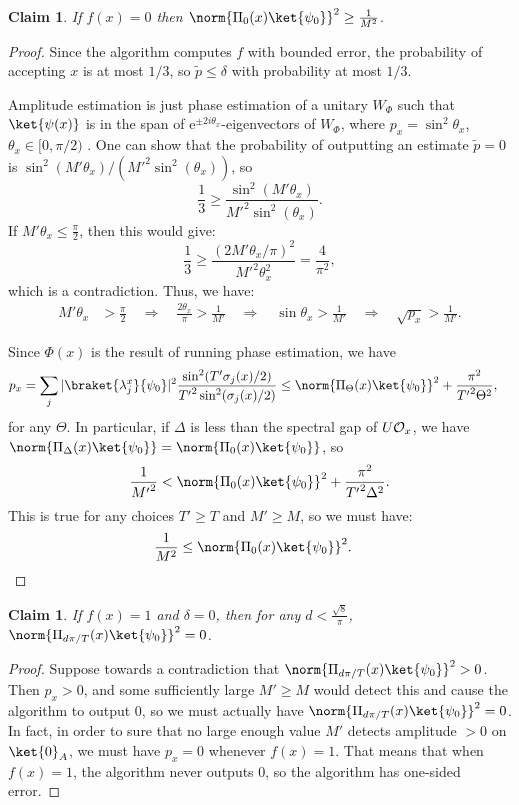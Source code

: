 \documentclass[11pt]{article}
\numberwithin{equation}{section}
\newtheorem{claim}[theorem]{Claim}
\theoremstyle{definition}
\theoremstyle{plain}
\newcommand{\eee}{\mathrm e}
\begin{document}
\begin{claim}
If $f(x)=0$ then $\norm{\Pi_0(x)\ket{\psi_0}}^2\geq \frac{1}{M^2}$.
\end{claim}
\begin{proof}
Since the algorithm computes $f$ with bounded error, the probability of accepting $x$ is at most $1/3$, so $\tilde p\leq\delta$ with probability at most $1/3$. 

Amplitude estimation is just phase estimation of a unitary $W_{\Phi}$ such that $\ket{\psi(x)}$ is in the span of $\eee^{\pm 2i\theta_x}$-eigenvectors of $W_{\Phi}$, where $p_x=\sin^2\theta_x$, $\theta_x\in [0,\pi/2)$ \cite{BHMT02}. One can show that the probability of outputting an estimate $\tilde p=0$ is $\sin^2(M'\theta_x)/({M'}^2\sin^2(\theta_x))$, so 
$$\frac{1}{3}\geq \frac{\sin^2(M'\theta_x)}{{M'}^2\sin^2(\theta_x)}.$$
If $M'\theta_x\leq \frac{\pi}{2}$, then this would give:
$$\frac{1}{3}\geq \frac{(2M'\theta_x/\pi)^2}{{M'}^2\theta_x^2}=\frac{4}{\pi^2},$$
which is a contradiction. Thus, we have:
\begin{align*}
M'\theta_x &> \frac{\pi}{2} 
\quad\Rightarrow\quad \frac{2\theta_x}{\pi} > \frac{1}{M'}
\quad\Rightarrow\quad \sin\theta_x > \frac{1}{M'}
\quad\Rightarrow\quad \sqrt{p_x} > \frac{1}{M'}.
\end{align*}

Since $\Phi(x)$ is the result of running phase estimation, we have 
\begin{align*}
p_x &= \sum_j |\braket{\lambda_j^x}{\psi_0}|^2\frac{\sin^2(T'\sigma_j(x)/2)}{{T'}^2\sin^2(\sigma_j(x)/2)}
\leq \norm{\Pi_\Theta(x)\ket{\psi_0}}^2+\frac{\pi^2}{{T'}^2\Theta^2},
\end{align*}
for any $\Theta$. In particular, if $\Delta$ is less than the spectral gap of $U{\cal O}_x$, we have $\norm{\Pi_\Delta(x)\ket{\psi_0}}=\norm{\Pi_0(x)\ket{\psi_0}}$, so 
$$\frac{1}{{M'}^2}< \norm{\Pi_0(x)\ket{\psi_0}}^2 + \frac{\pi^2}{{T'}^2\Delta^2}.$$
This is true for any choices $T'\geq T$ and $M'\geq M$, so we must have:
\begin{align*}
\frac{1}{M^2} &\leq \norm{\Pi_0(x)\ket{\psi_0}}^2.\qedhere
\end{align*}
\end{proof}

\begin{claim}
If $f(x)=1$ and $\delta=0$, then for any $d<\frac{\sqrt{8}}{\pi}$, $\norm{\Pi_{d\pi/T}(x)\ket{\psi_0}}^2=0$.
\end{claim}
\begin{proof}
Suppose towards a contradiction that $\norm{\Pi_{d\pi/T}(x)\ket{\psi_0}}^2>0$. Then $p_x>0$, and some sufficiently large $M'\geq M$ would detect this and cause the algorithm to output 0, so we must actually have $\norm{\Pi_{d\pi/T}(x)\ket{\psi_0}}^2=0$. In fact, in order to sure that no large enough value $M'$ detects amplitude $>0$ on $\ket{0}_A$, we must have $p_x=0$ whenever $f(x)=1$. That means that when $f(x)=1$, the algorithm never outputs 0, so the algorithm has one-sided error.
\end{proof}
\end{document}
